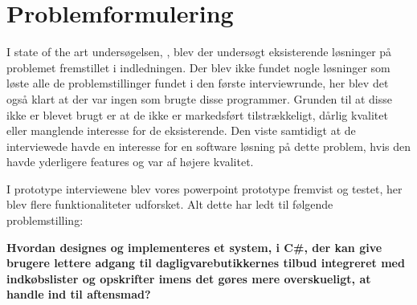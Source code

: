 \section{Problemformulering}\label{section:problemformulering}

%
%
%


I state of the art undersøgelsen, , blev der undersøgt eksisterende løsninger på problemet fremstillet i indledningen. 
Der blev ikke fundet nogle løsninger som løste alle de problemstillinger fundet i den første interviewrunde, her blev det også klart at der var ingen som brugte disse programmer.
Grunden til at disse ikke er blevet brugt er at de ikke er markedsført tilstrækkeligt, dårlig kvalitet eller manglende interesse for de eksisterende. 
Den viste samtidigt at de interviewede havde en interesse for en software løsning på dette problem, hvis den havde yderligere features og var af højere kvalitet. 

I prototype interviewene blev vores powerpoint prototype fremvist og testet, her blev flere funktionaliteter udforsket. 
Alt dette har ledt til følgende problemstilling:

\textbf{Hvordan designes og implementeres et system, i C\#, der kan give brugere lettere adgang til dagligvarebutikkernes tilbud integreret med indkøbslister og opskrifter imens det gøres mere overskueligt, at handle ind til aftensmad? }
